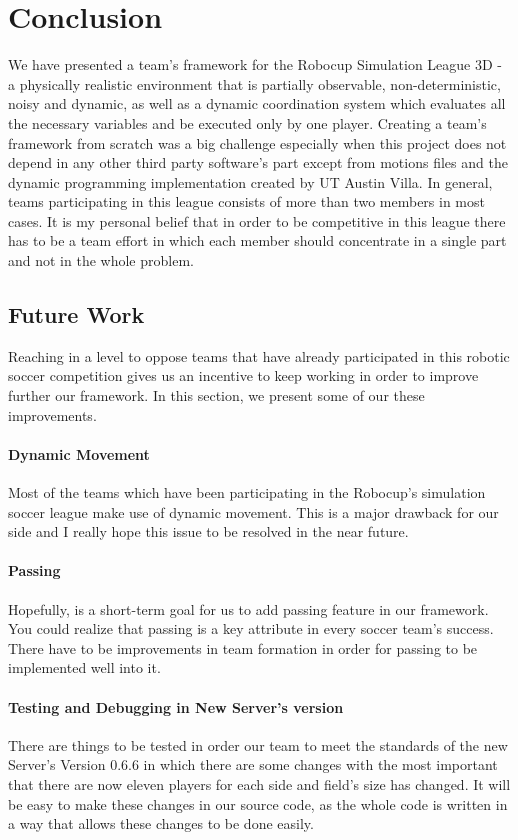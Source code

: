 \chapter{Conclusion}
\label{conclusion}

We have presented a team's framework for the Robocup Simulation League 3D - a physically realistic environment that is partially observable, non-deterministic, noisy and dynamic, as well as a dynamic coordination system which evaluates all the necessary variables and be executed only by one player. Creating a team's framework from scratch was a big challenge especially when this project does not depend in any other third party software's part except from motions files and the dynamic programming implementation created by UT Austin Villa. In general, teams participating in this league consists of more than two members in most cases. It is my personal belief that in order to be competitive in this league there has to be a team effort in which each member should concentrate in a single part and not in the whole problem.

\section{Future Work}
Reaching in a level to oppose teams that have already participated in this robotic soccer competition gives us an incentive to keep working in order to improve further our framework. In this section, we present some of our these improvements.  

\subsubsection*{Dynamic Movement}
Most of the teams which have been participating in the Robocup's simulation soccer league make use of dynamic movement. This is a major drawback for our side and I really hope this issue to be resolved in the near future.
\subsubsection*{Passing}
Hopefully, is a short-term goal for us to add passing feature in our framework. You could realize that passing is a key attribute in every soccer team's success. There have to be improvements in team formation in order for passing to be implemented well into it.
\subsubsection*{Testing and Debugging in New Server's version}
There are things to be tested in order our team to meet the standards of the new Server's Version 0.6.6 in which there are some changes with the most important that there are now eleven players for each side and field's size has changed. It will be easy to make these changes in our source code, as the whole code is written in a way that allows these changes to be done easily.
